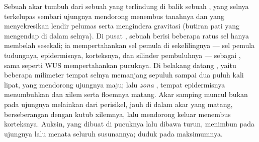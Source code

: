 \begin{proposition}\label{prop:b2:plant-meristems:ram}
Sebuah akar tumbuh dari sebuah  yang terlindung di balik
sebuah \emph{}, yang selnya terkelupas sembari ujungnya
mendorong menembus tanahnya dan yang menyekresikan lendir pelumas serta
mengindera gravitasi (butiran pati yang mengendap di dalam selnya). Di
pusat , sebuah \emph{} berisi beberapa ratus sel
hanya membelah sesekali; ia mempertahankan sel pemula di sekelilingnya
--- sel pemula tudungnya, epidermisnya, korteksnya, dan silinder
pembuluhnya --- sebagai , sama seperti WUS mempertahankan  pucuknya. Di belakang  datang \emph{}, yaitu beberapa milimeter tempat selnya memanjang sepuluh
sampai dua puluh kali lipat, yang mendorong ujungnya maju; lalu
\emph{zona }, tempat epidermisnya menumbuhkan \emph{} dan xilem serta floemnya matang. Akar samping muncul bukan pada
ujungnya melainkan dari perisikel, jauh di dalam akar yang matang,
berseberangan dengan kutub xilemnya, lalu mendorong keluar menembus
korteksnya. Auksin, yang dibuat di pucuknya lalu dibawa turun,
menimbun pada ujungnya lalu menata seluruh susunannya; 
duduk pada maksimumnya.
\end{proposition}

